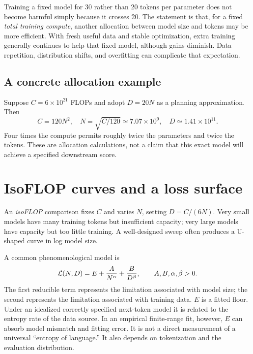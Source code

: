 Training a fixed model for 30 rather than 20 tokens per parameter does not become harmful simply because it crosses 20. The statement is that, for a fixed \emph{total training compute}, another allocation between model size and tokens may be more efficient. With fresh useful data and stable optimization, extra training generally continues to help that fixed model, although gains diminish. Data repetition, distribution shifts, and overfitting can complicate that expectation.

\subsection{A concrete allocation example}
Suppose $C=6\times10^{21}$ FLOPs and adopt $D=20N$ as a planning approximation. Then
\[
 C=120N^2,\quad N=\sqrt{C/120}\simeq7.07\times10^9,
 \quad D\simeq1.41\times10^{11}.
\]
Four times the compute permits roughly twice the parameters and twice the tokens. These are allocation calculations, not a claim that this exact model will achieve a specified downstream score.

\section{IsoFLOP curves and a loss surface}
An \emph{isoFLOP} comparison fixes $C$ and varies $N$, setting $D=C/(6N)$. Very small models have many training tokens but insufficient capacity; very large models have capacity but too little training. A well-designed sweep often produces a U-shaped curve in log model size.


A common phenomenological model is
\begin{equation}
\mathcal L(N,D)=E+\frac{A}{N^\alpha}+\frac{B}{D^\beta},
\qquad A,B,\alpha,\beta>0.
\label{eq:loss-surface}
\end{equation}
The first reducible term represents the limitation associated with model size; the second represents the limitation associated with training data. $E$ is a fitted floor. Under an idealized correctly specified next-token model it is related to the entropy rate of the data source. In an empirical finite-range fit, however, $E$ can absorb model mismatch and fitting error. It is not a direct measurement of a universal ``entropy of language.'' It also depends on tokenization and the evaluation distribution.

